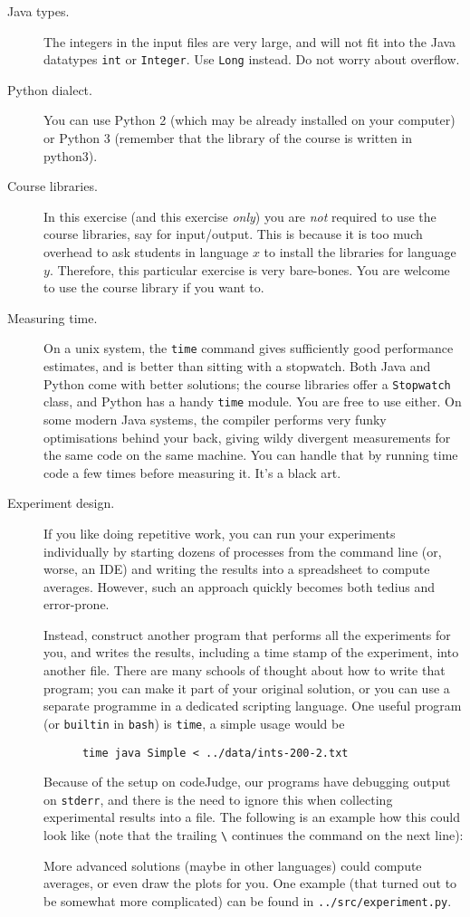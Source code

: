 \documentclass{tufte-handout}
\begin{document}
\begin{description}
  \item[Java types.] The integers in the input files are very large, and will not fit into the Java datatypes \texttt{int} or \texttt{Integer}.
    Use \texttt{Long} instead.
    Do not worry about overflow.
  \item[Python dialect.] You can use Python 2 (which may be already installed on your computer) or Python 3 (remember that the library of the course is written in python3).
  \item[Course libraries.]
    In this exercise (and this exercise \emph{only}) you are \emph{not} required to use the course libraries, say for input/output.
    This is because it is too much overhead to ask students in language $x$ to install the libraries for language $y$.
    Therefore, this particular exercise is very bare-bones.
    You are welcome to use the course library if you want to.
  \item[Measuring time.]
    On a unix system, the \texttt{time} command gives sufficiently good performance estimates, and is better than sitting with a stopwatch.
    Both Java and Python come with better solutions; the course libraries offer a \texttt{Stopwatch} class, and Python has a handy \texttt{time} module. You are free to use either. 
    On some modern Java systems, the compiler performs very funky optimisations behind your back, giving wildy divergent measurements for the same code on the same machine.
    You can handle that by running time code a few times before measuring it.
    It’s a black art.
  \item[Experiment design.]
    If you like doing repetitive work, you  can run your experiments individually by starting dozens of processes from the command line (or, worse, an IDE) and writing the results into a spreadsheet to compute averages.
    However, such an approach quickly becomes both tedius and error-prone.

    Instead, construct another program that performs all the experiments for you, and writes the results, including a time stamp of the experiment, into another file.
    There are many schools of thought about how to write that program; you can make it part of your original solution, or you can use a separate programme in a dedicated scripting language.
    One useful program (or \texttt{builtin} in \texttt{bash}) is \texttt{time}, a simple usage would be 
    \begin{lstlisting}
      time java Simple < ../data/ints-200-2.txt
    \end{lstlisting}
    Because of the setup on codeJudge, our programs have debugging output on \texttt{stderr}, and there is the need to ignore this when collecting experimental results into a file. 
    The following is an example how this could look like (note that the trailing \verb+\+ continues the command on the next line):
    

    More advanced solutions (maybe in other languages) could compute averages, or even draw the plots for you.
    One example (that turned out to be somewhat more complicated) can be found in \texttt{../src/experiment.py}.
\end{description}
\end{document}
